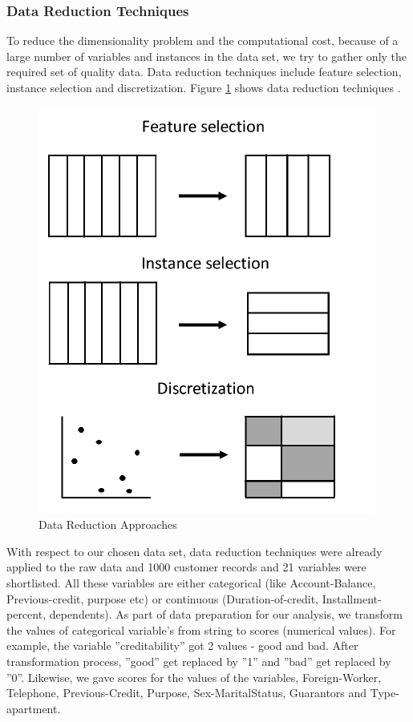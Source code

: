 \documentclass[sigconf]{acmart}
\begin{document}
\subsubsection{Data Reduction Techniques}

To reduce the dimensionality problem and the computational cost, because of a large number of variables and instances in the data set, we try to gather only the required set of quality data. Data reduction techniques include feature selection, instance selection and discretization. Figure \ref{fig:Figure6} shows data reduction techniques \cite{preprocessing}.

\begin{figure}[htb]
  \centering
  \includegraphics[width=1.0\columnwidth]{images/Figure6.png}
  \caption{Data Reduction Approaches
  \cite{preprocessing}}
  \label{fig:Figure6} 
\end{figure}

With respect to our chosen data set, data reduction techniques were already applied to the raw data and 1000 customer records and 21 variables were shortlisted. All these variables are either categorical (like Account-Balance, Previous-credit, purpose etc) or continuous (Duration-of-credit, Installment-percent, dependents). As part of data preparation for our analysis, we transform the values of categorical variable's from string to scores (numerical values). For example, the variable ''creditability'' got 2 values - good and bad. After transformation process, ''good'' get replaced by ''1'' and ''bad'' get replaced by ''0''. Likewise, we gave scores for the values of the variables, Foreign-Worker, Telephone, Previous-Credit, Purpose, Sex-MaritalStatus, Guarantors and Type-apartment.
\end{document}
